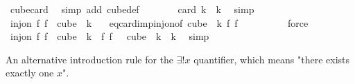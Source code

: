 \begin{isabellebody}
\ cube{\isacharunderscore}{\kern0pt}card\ \isamarkupfalse%
\ {\isacharparenleft}{\kern0pt}simp\ add{\isacharcolon}{\kern0pt}\ cube{\isacharunderscore}{\kern0pt}def{\isacharparenright}{\kern0pt}\isanewline
\ \ \ \ \isamarkupfalse%
\ \isamarkupfalse%
\ {\isachardoublequoteopen}card\ {\isacharbraceleft}{\kern0pt}{\isachardot}{\kern0pt}{\isachardot}{\kern0pt}{\isacharless}{\kern0pt}k{\isacharbraceright}{\kern0pt}\ {\isacharequal}{\kern0pt}\ k{\isachardoublequoteclose}\ \isamarkupfalse%
\ simp\isanewline
\ \ \ \ \isamarkupfalse%
\ \isamarkupfalse%
\ {\isachardoublequoteopen}inj{\isacharunderscore}{\kern0pt}on\ {\isacharparenleft}{\kern0pt}{\isasymlambda}f{\isachardot}{\kern0pt}\ f\ {}{\isacharparenright}{\kern0pt}\ {\isacharparenleft}{\kern0pt}cube\ {}\ k{\isacharparenright}{\kern0pt}{\isachardoublequoteclose}\ \isamarkupfalse%
\ {\isacharasterisk}{\kern0pt}\ eq{\isacharunderscore}{\kern0pt}card{\isacharunderscore}{\kern0pt}imp{\isacharunderscore}{\kern0pt}inj{\isacharunderscore}{\kern0pt}on{\isacharbrackleft}{\kern0pt}of\ {\isachardoublequoteopen}cube\ {}\ k{\isachardoublequoteclose}\ {\isachardoublequoteopen}{\isasymlambda}f{\isachardot}{\kern0pt}\ f\ {}{\isachardoublequoteclose}{\isacharbrackright}{\kern0pt}\ \isanewline
\ \ \ \ \ \ \isamarkupfalse%
\ force\isanewline
\ \ \isacommand{{\isacharbraceright}{\kern0pt}}\isamarkupfalse%
\isanewline
\ \ \isamarkupfalse%
\ \isamarkupfalse%
\ {\isachardoublequoteopen}inj{\isacharunderscore}{\kern0pt}on\ {\isacharparenleft}{\kern0pt}{\isasymlambda}f{\isachardot}{\kern0pt}\ f\ {}{\isacharparenright}{\kern0pt}\ {\isacharparenleft}{\kern0pt}cube\ {}\ k{\isacharparenright}{\kern0pt}\ {\isasymand}\ {\isacharparenleft}{\kern0pt}{\isasymlambda}f{\isachardot}{\kern0pt}\ f\ {}{\isacharparenright}{\kern0pt}\ {\isacharbackquote}{\kern0pt}\ cube\ {}\ k\ {\isacharequal}{\kern0pt}\ {\isacharbraceleft}{\kern0pt}{\isachardot}{\kern0pt}{\isachardot}{\kern0pt}{\isacharless}{\kern0pt}k{\isacharbraceright}{\kern0pt}{\isachardoublequoteclose}\ \isamarkupfalse%
\ simp\isanewline
{}\isamarkupfalse%
%
\endisatagproof
{\isafoldproof}%
%
\isadelimproof
%
\endisadelimproof
%
\begin{isamarkuptext}%
An alternative introduction rule for the $\exists!x$ quantifier, which means "there
exists exactly one $x$".%

\end{isamarkuptext}
\end{isabellebody}
